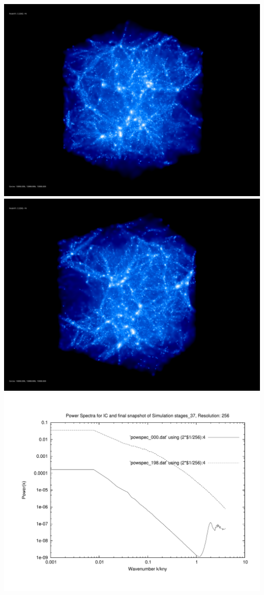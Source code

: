 \includegraphics[scale=0.1]{r256/stages_37/rotate_00074.jpg} 
\includegraphics[scale=0.1]{r256/stages_37/rotate_00131.jpg}  \\

\includegraphics[scale=0.5]{r256/stages_37/plot_powspec_stages_37}


